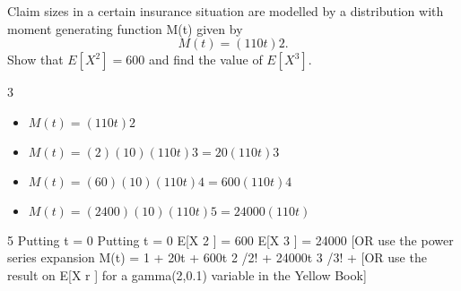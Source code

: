 \documentclass[a4paper,12pt]{article}
\begin{document}
Claim sizes in a certain insurance situation are modelled by a distribution with
moment generating function M(t) given by
\[M(t) = (1 10t) 2 .\]
Show that $E[X^2 ] = 600$ and find the value of $E[X^3 ]$.

\newpage

3
\begin{itemize}
\item ${ \displaystyle  M (t) = (1 10t) 2 }$
\item ${ \displaystyle M (t) = ( 2)( 10)(1 10t) 3 = 20(1 10t) 3 }$
\item ${ \displaystyle  M (t) = ( 60)( 10)(1 10t) 4 = 600(1 10t) 4}$
\item ${ \displaystyle  M (t) = ( 2400)( 10)(1 10t) 5 = 24000(1 10t)}$
\end{itemize}
5
Putting t = 0
Putting t = 0
E[X 2 ] = 600
E[X 3 ] = 24000
[OR use the power series expansion M(t) = 1 + 20t + 600t 2 /2! + 24000t 3 /3! +
[OR use the result on E[X r ] for a gamma(2,0.1) variable in the Yellow Book]
\end{document}

